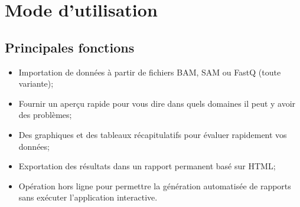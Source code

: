 \documentclass[a4paper,11pt]{article}
\begin{document}
\section{Mode d'utilisation}

\subsection{Principales fonctions}

\begin{itemize}
  \item Importation de données à partir de fichiers BAM, SAM ou FastQ
    (toute variante);
   \item Fournir un aperçu rapide pour vous dire dans quels domaines
     il peut y avoir des problèmes;
    \item Des graphiques et des tableaux récapitulatifs pour évaluer
      rapidement vos données;
     \item Exportation des résultats dans un rapport permanent basé
       sur HTML;
      \item Opération hors ligne pour permettre la génération
        automatisée de rapports sans exécuter l'application
        interactive.
\end{itemize}
\end{document}

